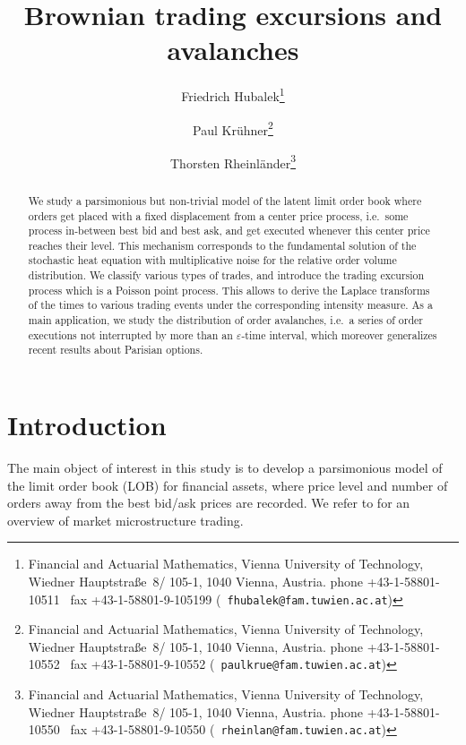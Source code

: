 \documentclass[11pt]{scrartcl}
\begin{document}
\title{Brownian trading excursions and avalanches}
\author{Friedrich Hubalek\thanks{%
Financial and Actuarial Mathematics, Vienna University of Technology,
Wiedner Hauptstraße~8/ 105-1, 1040 Vienna, Austria. phone
+43-1-58801-10511 \ fax +43-1-58801-9-105199 (\texttt{%
fhubalek@fam.tuwien.ac.at})} \and Paul Krühner\thanks{%
Financial and Actuarial Mathematics, Vienna University of Technology,
Wiedner Hauptstraße~8/ 105-1, 1040 Vienna, Austria. phone
+43-1-58801-10552 \ fax +43-1-58801-9-10552 (\texttt{%
paulkrue@fam.tuwien.ac.at})} \and Thorsten Rheinländer\thanks{%
Financial and Actuarial Mathematics, Vienna University of Technology,
Wiedner Hauptstraße~8/ 105-1, 1040 Vienna, Austria. phone
+43-1-58801-10550 \ fax +43-1-58801-9-10550 (\texttt{%
rheinlan@fam.tuwien.ac.at})} }
\maketitle

\begin{abstract}
{We study a parsimonious but non-trivial model of the latent limit order book
where orders get placed with a fixed displacement from a center price process,
i.e.\ some process in-between best bid and best ask, and get
executed whenever this center price reaches their level. This mechanism
corresponds to the fundamental solution of the stochastic heat equation with
multiplicative noise for the relative order volume distribution. We classify
various types of trades, and introduce the trading excursion process which is
a Poisson point process. This allows to derive the Laplace transforms of the
times to various trading events under the corresponding intensity measure. As
a main application, we study the distribution of order avalanches, i.e.\ a
series of order executions not interrupted by more than an $\varepsilon$-time
interval, which moreover generalizes recent results about Parisian options.}

\end{abstract}

\section{Introduction}

The main object of interest in this study is to develop a parsimonious model
of the limit order book (LOB) for financial assets, where price level and
number of orders away from the best bid/ask prices are recorded. We refer to
\cite{Cartea} for an overview of market
microstructure trading.
\end{document}
